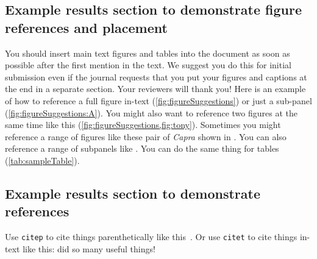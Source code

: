\subsection{Example results section to demonstrate figure references and placement}

You should insert main text figures and tables into the document as soon as possible after the first mention in the text. We suggest you do this for initial submission even if the journal requests that you put your figures and captions at the end in a separate section. Your reviewers will thank you! Here is an example of how to reference a full figure in-text (\cref{fig:figureSuggestions}) or just a sub-panel (\cref{fig:figureSuggestions:A}). You might also want to reference two figures at the same time like this (\cref{fig:figureSuggestions,fig:tony}). Sometimes you might reference a range of figures like these pair of \textit{Capra} shown in . You can also reference a range of subpanels like . You can do the same thing for tables (\cref{tab:sampleTable}).

\figureSuggestions %

\subsection{Example results section to demonstrate references}
Use \texttt{citep} to cite things parenthetically like this~\citep{Kent2002, einstein}. Or use \texttt{citet} to cite things in-text like this: \citet{Kent2002} did so many useful things!


